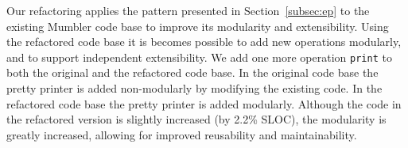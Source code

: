Our refactoring applies the pattern presented in
Section~\ref{subsec:ep} to the existing Mumbler code base to improve
its modularity and extensibility. Using the refactored code base it is 
becomes possible to add new operations modularly, and to support
independent extensibility. We add one more
operation \texttt{print} to both the original and the refactored code
base. In the original code base the pretty printer is added
non-modularly by modifying the existing code. In the refactored code
base the pretty printer is added modularly.
Although the code in the refactored version is slightly increased (by 2.2\% SLOC), the
modularity is greatly increased, allowing for improved reusability and maintainability.


